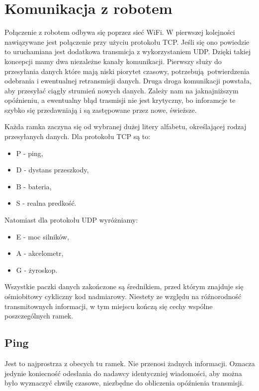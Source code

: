\documentclass[12pt,a4paper,polish]{article}
\begin{document}
  \section{Komunikacja z robotem}

  Połączenie z robotem odbywa się poprzez sieć WiFi. W pierwszej kolejności 
  nawiązywane jest połączenie przy użyciu protokołu TCP. Jeśli się ono powiedzie
  to uruchamiana jest dodatkowa transmicja z wykorzystaniem UDP. 
  Dzięki takiej koncepcji mamy dwa niezależne kanały komunikacji. Pierwszy służy
  do przesyłania danych które mają niski piorytet czasowy, potrzebują potwierdzenia
  odebrania i ewentualnej retransmisji danych. Druga droga komunikacji powstała, 
  aby przesyłać ciągły strumień nowych danych. Zależy nam na jaknajniższym opóźnieniu,
  a ewentualny błąd trasmisji nie jest krytyczny, bo inforamcje te szybko się 
  przedawniają i są zastępowane przez nowe, świeższe. \newline

  Każda ramka zaczyna się od wybranej dużej litery alfabetu, określającej rodzaj 
  przesyłanych danych. Dla protokołu TCP są to:

      \begin{itemize}
        \item P - ping,
        \item D - dystans przeszkody,
        \item B - bateria,
        \item S - realna predkość.
      \end{itemize}
      
  Natomiast dla protokołu UDP wyróżniamy:
    \begin{itemize}
      \item E - moc silników,
      \item A - akcelometr,
      \item G - żyroskop.
    \end{itemize}

  Wszystkie paczki danych zakończone są średnikiem, przed którym znajduje się
  ośmiobitowy cykliczny kod nadmiarowy. Niestety ze względu na róźnorodność 
  transmitownych informacji, w tym miejscu kończą się cechy wspólne poszczególnych 
  ramek.

  \subsection{Ping}
  Jest to najprostrza z obecych tu ramek. Nie przenosi żadnych informacji.
  Oznacza jedynie koniecność odesłania do nadawcy identyczniej wiadomości,
  aby można było wyznaczyć chwilę czasowe, niezbędne do obliczenia opóźnienia
  transmisji.
\end{document}
